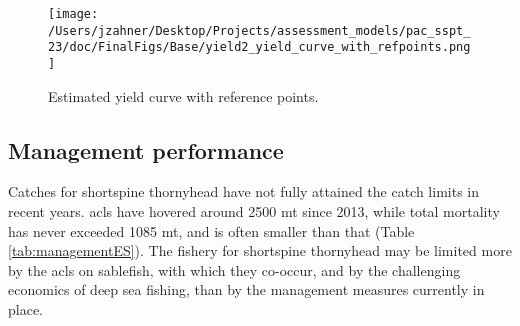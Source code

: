 \documentclass[11pt,
  letterpaper,
]{article}
\begin{document}
\begin{figure}
{\centering
\texttt{[image: /Users/jzahner/Desktop/Projects/assessment\_models/pac\_sspt\_23/doc/FinalFigs/Base/yield2\_yield\_curve\_with\_refpoints.png]}
}
\caption{Estimated yield curve with reference points.\label{fig:yieldcurveES}}
\end{figure}

\hypertarget{management-performance}{%
\subsection*{Management performance}\label{management-performance}}

Catches for shortspine thornyhead have not fully attained the catch limits in recent years. \Gls{acl}s have hovered around 2500 mt since 2013, while total mortality has never exceeded 1085 mt, and is often smaller than that (Table \ref{tab:managementES}). The fishery for shortspine thornyhead may be limited more by the \gls{acl}s on sablefish, with which they co-occur, and by the challenging economics of deep sea fishing, than by the management measures currently in place. \begingroup\fontsize{10}{12}\selectfont \begingroup\fontsize{10}{12}\selectfont
\end{document}
